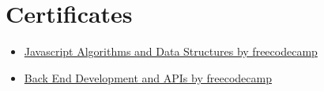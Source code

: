 \documentclass[a4paper]{article}
\begin{document}
\section{Certificates}
\begin{itemize}
	\item
	      \href{https://www.freecodecamp.org/certification/jaydamani/javascript-algorithms-and-data-structures}{Javascript Algorithms and Data Structures by freecodecamp}
	\item
	      \href{https://www.freecodecamp.org/certification/jaydamani/back-end-development-and-apis}{Back End Development and APIs by freecodecamp}
\end{itemize}
\end{document}
